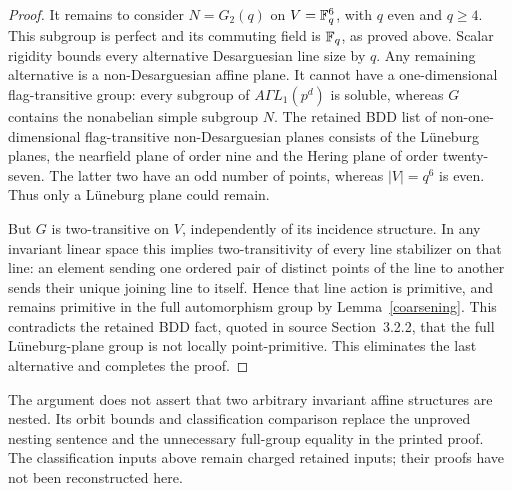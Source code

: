 \begin{proof}
It remains to consider $N=G_2(q)$ on $V=\mathbb F_q^6$, with $q$ even and
$q\geq4$. This subgroup is perfect and its commuting field is
$\mathbb F_q$, as proved above. Scalar rigidity bounds every alternative
Desarguesian line size by $q$. Any remaining alternative is a
non-Desarguesian affine plane. It cannot have a one-dimensional
flag-transitive group: every subgroup of $A\Gamma L_1(p^d)$ is
soluble, whereas $G$ contains the nonabelian simple subgroup $N$.
The retained BDD list of non-one-dimensional flag-transitive
non-Desarguesian planes consists of the L\"uneburg planes, the nearfield
plane of order nine and the Hering plane of order twenty-seven.
The latter two have an odd number of points, whereas $|V|=q^6$ is
even. Thus only a L\"uneburg plane could remain.

But $G$ is two-transitive on $V$, independently of its incidence
structure. In any invariant linear space this implies two-transitivity
of every line stabilizer on that line: an element sending one ordered
pair of distinct points of the line to another sends their unique
joining line to itself. Hence that line action is primitive, and remains
primitive in the full automorphism group by Lemma~\ref{coarsening}.
This contradicts the retained BDD fact, quoted in source Section~3.2.2,
that the full L\"uneburg-plane group is not locally point-primitive.
This eliminates the last alternative and completes the proof.
\end{proof}

The argument does not assert that two arbitrary invariant affine
structures are nested. Its orbit bounds and classification comparison
replace the unproved nesting sentence and the unnecessary full-group
equality in the printed proof. The classification inputs above remain
charged retained inputs; their proofs have not been reconstructed here.
